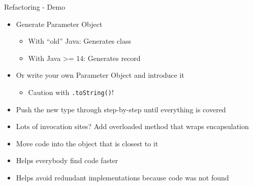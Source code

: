\begin{frame}[fragile]{\de{}\en{}}

\begin{center}
{
\huge
Refactoring - Demo
}
\end{center}

\end{frame}

\begin{frame}[fragile]{\de{}}

\begin{itemize}
\item Generate Parameter Object
\begin{itemize}
\item With ``old'' Java: Generates class
\item With Java >= 14: Generates record
\end{itemize}
\item Or write your own Parameter Object and introduce it
\begin{itemize}
\item Caution with \texttt{.toString()}!
\end{itemize}
\item Push the new type through step-by-step until everything is covered
\item Lots of invocation sites? Add overloaded method that wraps encapsulation
\end{itemize}

\end{frame}


\begin{frame}[fragile]{\de{}}

\begin{itemize}
\item Move code into the object that is closest to it
\item Helps everybody find code faster
\item Helps avoid redundant implementations because code was not found
\end{itemize}

\end{frame}

